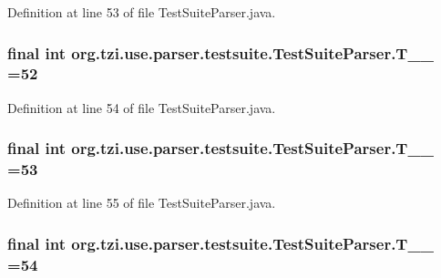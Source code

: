 Definition at line 53 of file Test\-Suite\-Parser.\-java.

\hypertarget{classorg_1_1tzi_1_1use_1_1parser_1_1testsuite_1_1_test_suite_parser_a51a03aa07c202e0de9cfb4d183e3126a}{
\subsubsection[{T\-\_\-\-\_\-52}]{\setlength{\rightskip}{0pt plus 5cm}final int org.\-tzi.\-use.\-parser.\-testsuite.\-Test\-Suite\-Parser.\-T\-\_\-\-\_ =52\hspace{0.3cm}{\ttfamily [static]}}}\label{classorg_1_1tzi_1_1use_1_1parser_1_1testsuite_1_1_test_suite_parser_a51a03aa07c202e0de9cfb4d183e3126a}


Definition at line 54 of file Test\-Suite\-Parser.\-java.

\hypertarget{classorg_1_1tzi_1_1use_1_1parser_1_1testsuite_1_1_test_suite_parser_a8d523a1d73329ff030f62184fb8c1741}{
\subsubsection[{T\-\_\-\-\_\-53}]{\setlength{\rightskip}{0pt plus 5cm}final int org.\-tzi.\-use.\-parser.\-testsuite.\-Test\-Suite\-Parser.\-T\-\_\-\-\_ =53\hspace{0.3cm}{\ttfamily [static]}}}\label{classorg_1_1tzi_1_1use_1_1parser_1_1testsuite_1_1_test_suite_parser_a8d523a1d73329ff030f62184fb8c1741}


Definition at line 55 of file Test\-Suite\-Parser.\-java.

\hypertarget{classorg_1_1tzi_1_1use_1_1parser_1_1testsuite_1_1_test_suite_parser_a7efde3ff0d80449538a05a1133bc8dc9}{
\subsubsection[{T\-\_\-\-\_\-54}]{\setlength{\rightskip}{0pt plus 5cm}final int org.\-tzi.\-use.\-parser.\-testsuite.\-Test\-Suite\-Parser.\-T\-\_\-\-\_ =54\hspace{0.3cm}{\ttfamily [static]}}}\label{classorg_1_1tzi_1_1use_1_1parser_1_1testsuite_1_1_test_suite_parser_a7efde3ff0d80449538a05a1133bc8dc9}


